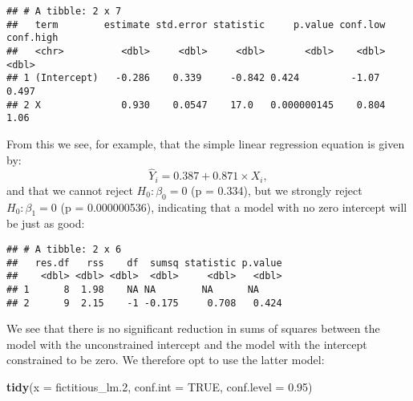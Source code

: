 \documentclass[
]{book}
\newenvironment{Shaded}{\begin{snugshade}}{\end{snugshade}}
\newcommand{\CommentTok}[1]{\textcolor[rgb]{0.56,0.35,0.01}{\textit{#1}}}
\newcommand{\DataTypeTok}[1]{\textcolor[rgb]{0.13,0.29,0.53}{#1}}
\newcommand{\DecValTok}[1]{\textcolor[rgb]{0.00,0.00,0.81}{#1}}
\newcommand{\FloatTok}[1]{\textcolor[rgb]{0.00,0.00,0.81}{#1}}
\newcommand{\KeywordTok}[1]{\textcolor[rgb]{0.13,0.29,0.53}{\textbf{#1}}}
\newcommand{\NormalTok}[1]{#1}
\newcommand{\OperatorTok}[1]{\textcolor[rgb]{0.81,0.36,0.00}{\textbf{#1}}}
\newcommand{\OtherTok}[1]{\textcolor[rgb]{0.56,0.35,0.01}{#1}}
\newcommand{\StringTok}[1]{\textcolor[rgb]{0.31,0.60,0.02}{#1}}
\begin{document}
\begin{verbatim}
## # A tibble: 2 x 7
##   term        estimate std.error statistic     p.value conf.low conf.high
##   <chr>          <dbl>     <dbl>     <dbl>       <dbl>    <dbl>     <dbl>
## 1 (Intercept)   -0.286    0.339     -0.842 0.424         -1.07      0.497
## 2 X              0.930    0.0547    17.0   0.000000145    0.804     1.06
\end{verbatim}

From this we see, for example, that the simple linear regression equation is given by:
\[
\hat Y_i = 0.387 + 0.871\times X_i,  
\]
and that we cannot reject \(H_0: \beta_0=0\) (p = 0.334), but we strongly reject \(H_0:\beta_1 = 0\) (p = 0.000000536), indicating that a model with no zero intercept will be just as good:

\begin{Shaded}
\end{Shaded}

\begin{verbatim}
## # A tibble: 2 x 6
##   res.df   rss    df  sumsq statistic p.value
##    <dbl> <dbl> <dbl>  <dbl>     <dbl>   <dbl>
## 1      8  1.98    NA NA        NA      NA    
## 2      9  2.15    -1 -0.175     0.708   0.424
\end{verbatim}

We see that there is no significant reduction in sums of squares between the model with the unconstrained intercept and the model with the intercept constrained to be zero. We therefore opt to use the latter model:

\begin{Shaded}
\begin{Highlighting}[]
\KeywordTok{tidy}\NormalTok{(}\DataTypeTok{x =}\NormalTok{ fictitious_lm}\FloatTok{.2}\NormalTok{,}
     \DataTypeTok{conf.int =} \OtherTok{TRUE}\NormalTok{,}
     \DataTypeTok{conf.level =} \FloatTok{0.95}\NormalTok{)}
\end{Highlighting}
\end{Shaded}
\end{document}
